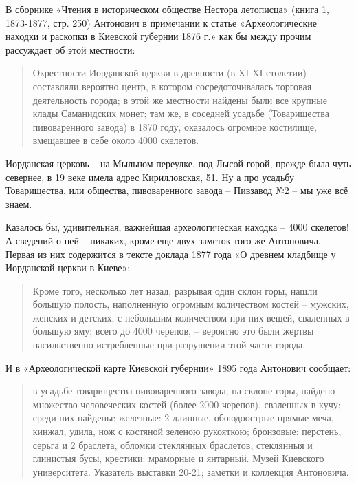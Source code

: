 В сборнике «Чтения в историческом обществе Нестора летописца» (книга 1, 1873-1877, стр. 250) Антонович в примечании к статье «Археологические находки и раскопки в Киевской губернии 1876 г.» как бы между прочим рассуждает об этой местности:

\begin{quotation}
Окрестности Иорданской церкви в древности (в XI-XI столетии) составляли вероятно центр, в котором сосредоточивалась торговая деятельность города; в этой же местности найдены были все крупные клады Саманидских монет; там же, в соседней усадьбе (Товарищества пивоваренного завода) в 1870 году, оказалось огромное костилище, вмещавшее в себе около 4000 скелетов.
\end{quotation}

Иорданская церковь – на Мыльном переулке, под Лысой горой, прежде была чуть севернее, в 19 веке имела адрес Кирилловская, 51. Ну а про усадьбу Товарищества, или общества, пивоваренного завода – Пивзавод №2 – мы уже всё знаем.

Казалось бы, удивительная, важнейшая археологическая находка – 4000 скелетов! А сведений о ней – никаких, кроме еще двух заметок того же Антоновича. Первая из них содержится в тексте доклада 1877 года «О древнем кладбище у Иорданской церкви в Киеве»:

\begin{quotation}
Кроме того, несколько лет назад, разрывая один склон горы, нашли большую полость, наполненную огромным количеством костей – мужских, женских и детских, с небольшим количеством при них вещей, сваленных в большую яму; всего до 4000 черепов, – вероятно это были жертвы насильственно истребленные при разрушении этой части города.
\end{quotation}

И в «Археологической карте Киевской губернии»\cite{antonovich01} 1895 года Антонович сообщает:

\begin{quotation}
в усадьбе товарищества пивоваренного завода, на склоне горы, найдено множество человеческих костей (более 2000 черепов), сваленных в кучу; среди них найдены: железные: 2 длинные, обо\-юдоострые прямые меча, кинжал, удила, нож с костяной зеленою рукояткою; бронзовые: перстень, серьга и 2 браслета, обломки стеклянных браслетов, стеклянныя и глинистыя бусы, крестики: мраморные и янтарный. Музей Киевского университета. Указатель выставки 20-21; заметки и коллекция Антоновича.
\end{quotation}

